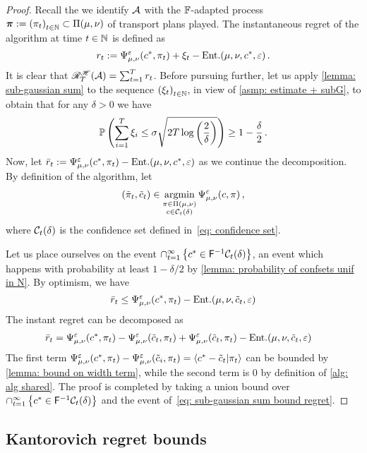 \begin{proof}
    Recall the we identify $\mathcal{A}$ with the $\mathbb{F}$-adapted process $\bm{\pi}:={(\pi_t)}_{t\in\mathbb{N}}\subset\Pi(\mu,\nu)$ of transport plans played. The instantaneous regret of the algorithm at time $t\in\mathbb{N}$ is defined as
    \[
        r_t:= \Psi_{\mu,\nu}^\varepsilon(c^*,\pi_t)+\xi_t - \text{Ent.}(\mu,\nu,c^*,\varepsilon)\,.
    \]
    It is clear that $\mathscr{R}_T^{\mathscr{H}}(\mathcal{A})=\sum_{t=1}^T r_t$.
    Before pursuing further, let us apply \cref{lemma: sub-gaussian sum} to the sequence ${(\xi_t)}_{t\in\mathbb{N}}$, in view of \cref{asmp: estimate + subG}, to obtain that for any $\delta>0$ we have
    \begin{align}
        \mathbb{P}\left(\sum_{i=1}^T \xi_i \le \sigma\sqrt{2T\log\left(\frac2\delta\right)}\right)\ge 1-\frac\delta2\,.\label{eq: sub-gaussian sum bound regret}
    \end{align}
    Now, let $\bar r_t :=  \Psi_{\mu,\nu}^\varepsilon(c^*,\pi_t)- \text{Ent.}(\mu,\nu,c^*,\varepsilon)$ as we continue the decomposition. By definition of the algorithm, let 
    \begin{align} 
        (\tilde\pi_t,\tilde c_t)\in\operatorname*{argmin}_{\substack{\pi\in\Pi(\mu,\nu)\\c\in\mathcal{C}_t(\delta)}} \Psi_{\mu,\nu}^\varepsilon(c,\pi)\notag\,,
    \end{align}
    where $\mathcal{C}_t(\delta)$ is the confidence set defined in~\eqref{eq: confidence set}.
    
    Let us place ourselves on the event $\cap_{t=1}^\infty\left\{c^*\in\mathsf{F}^{-1}\mathcal{C}_t(\delta)\right\}$, an event which happens with probability at least $1-\delta/2$ by \cref{lemma: probability of confsets unif in N}. By optimism, we have 
    \[
        \bar r_t \le  \Psi_{\mu,\nu}^\varepsilon(c^*,\pi_t)- \text{Ent.}(\mu,\nu,\tilde c_t,\varepsilon)
    \]
    The instant regret can be decomposed as
    \begin{align*}
        \bar r_t &= \Psi_{\mu,\nu}^\varepsilon(c^*,\pi_t) -\Psi_{\mu,\nu}^\varepsilon(\tilde c_t,\pi_t) + \Psi_{\mu,\nu}^\varepsilon(\tilde c_t,\pi_t) -\text{Ent.}(\mu,\nu,\tilde c_t,\varepsilon) 
    \end{align*}
    The first term $\Psi_{\mu,\nu}^\varepsilon(c^*,\pi_t) -\Psi_{\mu,\nu}^\varepsilon(\tilde c_i,\pi_t)=\langle c^*-\tilde c_t\vert \pi_t\rangle$ can be bounded by \cref{lemma: bound on width term}, while the second term is $0$ by definition of \cref{alg: alg shared}. The proof is completed by taking a union bound over $\cap_{t=1}^\infty\left\{c^*\in\mathsf{F}^{-1}\mathcal{C}_t(\delta)\right\}$ and the event of~\eqref{eq: sub-gaussian sum bound regret}.
\end{proof}


\subsection{Kantorovich regret bounds}\label{subsec: kantorovich regret}

